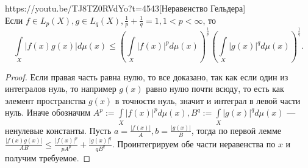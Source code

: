 \begin{linkthm}{https://youtu.be/TJ8TZ0RVdYo?t=4543}[Неравенство Гельдера]\ \\
	Если $f\in L_p(X), g\in L_q(X), \frac{1}{p}+\frac{1}{q}=1, 1<p<\infty$, то $$\int\limits_X |f(x)g(x)|d\mu(x)\leqslant \left(\int\limits_X |f(x)|^pd\mu(x)\right)^{\frac{1}{p}}
	\left(\int\limits_X |g(x)|^qd\mu(x)\right)^{\frac{1}{q}}. $$
\end{linkthm}

\begin{proof}
	Если правая часть равна нулю, то все доказано, так как если один из интегралов нуль, то например $g(x)$ равно нулю почти всюду, то есть как элемент пространства $g(x)$ в точности нуль, значит и интеграл в левой части нуль. Иначе обозначим $A^p:=\int\limits_X |f(x)|^p d\mu(x), B^q:=\int\limits_X |g(x)|^qd\mu(x)$ --- ненулевые константы. Пусть $a=\frac{|f(x)|}{A}, b=\frac{|g(x)|}{B}$, тогда по первой лемме $\frac{|f(x)g(x)|}{AB}\leqslant\frac{|f(x)|^p}{pA^p}+\frac{|g(x)|^q}{qB^q}$. Проинтегрируем обе части неравенства по $x$ и получим требуемое.
\end{proof}








